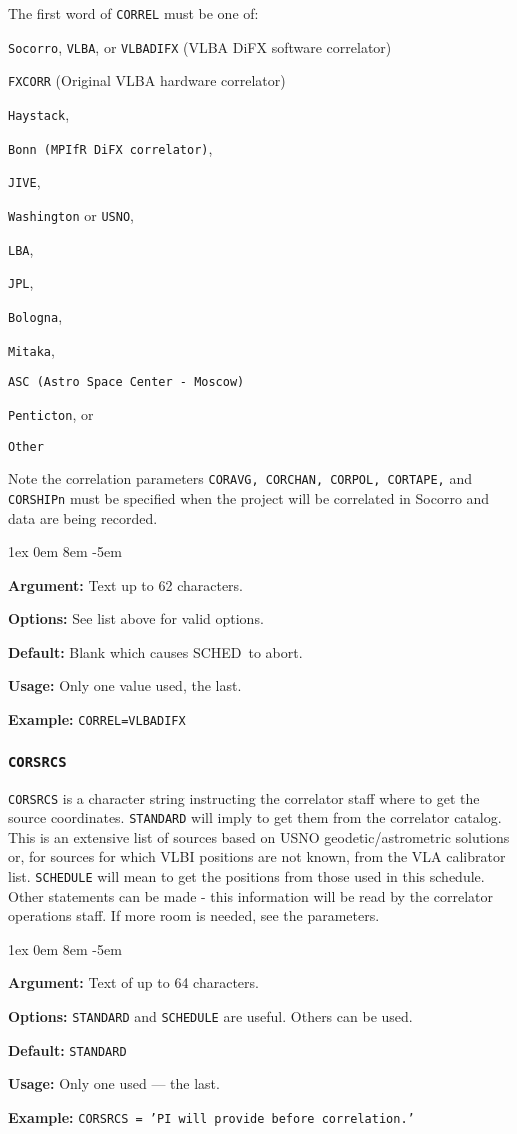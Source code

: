 \documentclass{report}
\newcommand{\schedb}{{\sc SCHED~}}
\newcommand{\rcwbox}[5]{
  \begin{list}{}{\parsep 1ex  \itemsep 0em
                 \leftmargin 8em  \itemindent -5em }
    \item {\bf Argument:} #1
    \item {\bf Options:}  #2
    \item {\bf Default:}  #3
    \item {\bf Usage:}    #4
    \item {\bf Example:}  #5
  \end{list}
}
\begin{document}
The first word of {\tt CORREL} must be one of:
\begin{list}{}{\parsep 0em  \itemsep 0em }
\item {\tt Socorro}, {\tt VLBA}, or {\tt VLBADIFX}
(VLBA DiFX software correlator)
\item {\tt FXCORR} (Original VLBA hardware correlator)
\item {\tt Haystack},
\item {\tt Bonn (MPIfR DiFX correlator)},
\item {\tt JIVE},
\item {\tt Washington} or {\tt USNO},
\item {\tt LBA},
\item {\tt JPL},
\item {\tt Bologna},
\item {\tt Mitaka},
\item {\tt ASC (Astro Space Center - Moscow)}
\item {\tt Penticton}, or
\item {\tt Other}
\end{list}

Note the correlation parameters {\tt CORAVG, CORCHAN,
CORPOL, CORTAPE,} and {\tt CORSHIPn} must be specified when
the project will be correlated in Socorro and data
are being recorded.

\rcwbox
{Text up to 62 characters.}
{See list above for valid options.}
{Blank which causes \schedb to abort.}
{Only one value used, the last.}
{{\tt CORREL=VLBADIFX}}


\subsubsection{\label{MP:CORSRCS}{\tt CORSRCS}}

{\tt CORSRCS} is a character string instructing the correlator
staff where to get the source coordinates.  {\tt STANDARD}
will imply to get them from the correlator catalog.  This is
an extensive list of sources based on USNO geodetic/astrometric
solutions or, for sources for which VLBI positions are not
known, from the VLA calibrator list.  {\tt SCHEDULE} will
mean to get the positions from those used in this schedule.
Other statements can be made - this information will be
read by the correlator operations staff.  If more room is
needed, see the  parameters.

\rcwbox
{Text of up to 64 characters.}
{{\tt STANDARD} and {\tt SCHEDULE} are useful.  Others can be
used.}
{{\tt STANDARD}}
{Only one used --- the last.}
{{\tt CORSRCS = 'PI will provide before correlation.'}}
\end{document}
